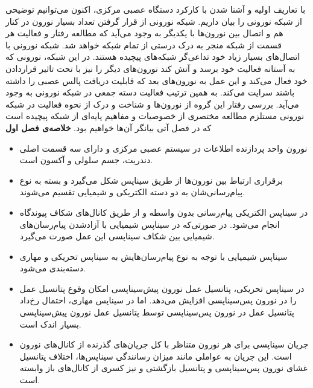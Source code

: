 با تعاریف اولیه و آشنا شدن با کارکرد دستگاه عصبی مرکزی، اکنون می‌توانیم توضیحی از شبکه نورونی را بیان داریم. شبکه نورونی از قرار گرفتن تعداد بسیار نورون در کنار هم و اتصال بین نورون‌ها با یکدیگر به وجود می‌آید که  مطالعه رفتار و فعالیت هر قسمت از شبکه منجر به درک درستی از تمام شبکه خواهد شد. شبکه نورونی با اتصال‌های بسیار زیاد خود تداعی‌گر شبکه‌های پیچیده‌ هستند.  در این شبکه، نورونی که به آستانه فعالیت خود برسد و آتش کند نورون‌های دیگر را نیز  با تحت تاثیر قراردادن  خود فعال می‌کند و این عمل به نورون‌های بعد که قابلیت دریافت پالس عصبی  را داشته باشند  سرایت می‌کند. به همین ترتیب فعالیت دسته جمعی در شبکه‌ نورونی به وجود می‌آید. بررسی  رفتار این گروه از نورون‌ها و شناخت و درک از نحوه فعالیت در شبکه نورونی مستلزم مطالعه مختصری از خصوصیات و مفاهیم پایه‌ای از شبکه پیچیده  است که در فصل آتی بیانگر آن‌ها خواهیم بود.
\newpage 
\textbf{خلاصه‌ی فصل اول}    \begin{itemize}
\item نورون واحد پردازنده اطلاعات در سیستم عصبی مرکزی و دارای سه قسمت اصلی دندریت، جسم سلولی و آکسون است.
\item برقراری ارتباط بین نورون‌ها از طریق سیناپس شکل می‌گیرد و بسته به نوع پیام‌رسانی‌شان به دو دسته الکتریکی و شیمیایی تقسیم می‌شوند. 
\item در سیناپس الکتریکی پیام‌رسانی بدون واسطه و از طریق کانال‌های شکاف پیوندگاه انجام می‌شود. در صورتی‌که در سیناپس شیمیایی با آزادشدن پیام‌رسان‌های شیمیایی بین شکاف سیناپسی این عمل صورت می‌گیرد.
\item سیناپس شیمیایی با توجه به نوع پیام‌رسان‌هایش به سیناپس تحریکی و مهاری دسته‌بندی می‌شود. 
\item در سیناپس تحریکی، پتانسیل عمل نورون‌ پیش‌سیناپسی امکان وقوع پتانسیل عمل را در نورون پس‌سیناپسی افزایش می‌دهد. اما در سیناپس مهاری، احتمال رخ‌داد پتانسیل عمل در نورون پس‌سیناپسی توسط پتانسیل عمل نورون پیش‌سیناپسی بسیار اندک است.
\item جریان سیناپسی برای هر نورون متناظر با کل جریان‌های گذرنده از کانال‌های نورون است. این جریان به عواملی مانند میزان رسانندگی سیناپس‌ها، اختلاف پتانسیل غشای نورون پس‌سیناپسی و پتانسیل بازگشتی و نیز کسری از کانال‌‌های باز وابسته است. 
\end{itemize}
